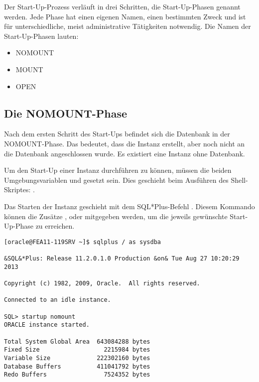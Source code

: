       Der Start-Up-Prozess verläuft in drei Schritten, die Start-Up-Phasen genannt werden. Jede Phase hat einen eigenen Namen, einen bestimmten Zweck und ist für unterschiedliche, meist administrative Tätigkeiten notwendig. Die Namen der Start-Up-Phasen lauten:
      \begin{itemize}
        \item NOMOUNT
        \item MOUNT
        \item OPEN
      \end{itemize}
      \subsection{Die NOMOUNT-Phase}
        Nach dem ersten Schritt des Start-Ups befindet sich die Datenbank in der NOMOUNT-Phase. Das bedeutet, dass die Instanz erstellt, aber noch nicht an die Datenbank angeschlossen wurde. Es existiert eine Instanz ohne Datenbank.

        \begin{merke}
          Um den Start-Up einer Instanz durchführen zu können, müssen die beiden Umgebungsvariablen  und  gesetzt sein. Dies geschieht beim Ausführen des Shell-Skriptes: .
        \end{merke}
        Das Starten der Instanz geschieht mit dem SQL*Plus-Befehl . Diesem Kommando können die Zusätze ,  oder  mitgegeben werden, um die jeweils gewünschte Start-Up-Phase zu erreichen.
        \begin{lstlisting}[caption={Einen Start-Up bis zur NOMOUNT-Phase
        durchführen},label=admin01,language=sqlplus]
[oracle@FEA11-119SRV ~]$ sqlplus / as sysdba

&SQL&*Plus: Release 11.2.0.1.0 Production &on& Tue Aug 27 10:20:29 2013

Copyright (c) 1982, 2009, Oracle.  All rights reserved.

Connected to an idle instance.

SQL> startup nomount
ORACLE instance started.

Total System Global Area  643084288 bytes
Fixed Size                  2215984 bytes
Variable Size             222302160 bytes
Database Buffers          411041792 bytes
Redo Buffers                7524352 bytes
        \end{lstlisting}

